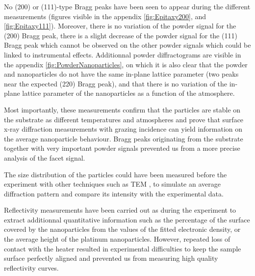 No (200) or (111)-type Bragg peaks have been seen to appear during the different measurements (figures visible in the appendix \ref{fig:Epitaxy200}, and \ref{fig:Epitaxy111}).
Moreover, there is no variation of the powder signal for the (200) Bragg peak, there is a slight decrease of the powder signal for the (111) Bragg peak which cannot be observed on the other powder signals which could be linked to instrumental effects.
Additionnal powder diffractograms are visible in the appendix \ref{fig:PowderNanoparticles}, on which it is also clear that the powder and nanoparticles do not have the same in-plane lattice parameter (two peaks near the expected (220) Bragg peak), and that there is no variation of the in-plane lattice parameter of the nanoparticles as a function of the atmosphere.

Most importantly, these measurements confirm that the particles are stable on the substrate as different temperatures and atmospheres and prove that surface x-ray diffraction measurements with grazing incidence can yield information on the average nanoparticle behaviour.
Bragg peaks originating from the  substrate together with very important powder signals prevented us from a more precise analysis of the facet signal.

The size distribution of the particles could have been measured before the experiment with other techniques such as TEM \parencite{Hejral2013}, to simulate an average diffraction pattern and compare its intensity with the experimental data.

Reflectivity measurements have been carried out as during the experiment to extract additionnal quantitative information such as the percentage of the surface covered by the nanoparticles from the values of the fitted electronic density, or the average height of the platinum nanoparticles.
However, repeated loss of contact with the heater resulted in experimental difficulties to keep the sample surface perfectly aligned and prevented us from measuring high quality reflectivity curves.